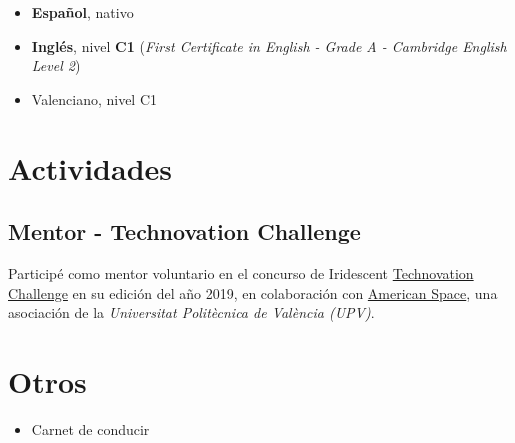 \documentclass[letterpaper, 12pt, dvipsnames]{article}
\newcommand{\upvFull}{{\upvName} ({\upv})}
\newcommand{\upvName}{Universitat Politècnica de València}
\newcommand{\upv}{UPV}
\newcommand{\fce}{\emph{First Certificate in English - Grade A - Cambridge English Level 2}}
\begin{document}
\begin{itemize}
    \item \textbf{Español}, nativo
    \item \textbf{Inglés}, nivel \textbf{C1} (\fce)
    \item Valenciano, nivel C1
\end{itemize}

\section*{Actividades}

\subsection*{Mentor - Technovation Challenge}

Participé como mentor voluntario en el concurso de Iridescent \href{https://technovationchallenge.org/}{Technovation Challenge} en su edición del año 2019, en colaboración con \href{https://americanspacev.upv.es/}{American Space}, una asociación de la \emph{\upvFull}.

\section*{Otros}

\begin{itemize}
    \item Carnet de conducir
\end{itemize}
\end{document}
